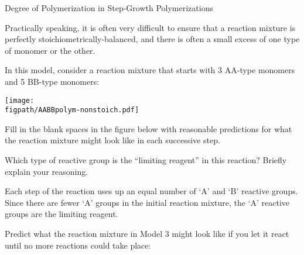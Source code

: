 \begin{activity}{Degree of Polymerization in Step-Growth Polymerizations}
\begin{model}

Practically speaking, it is often very difficult to ensure that a reaction mixture is perfectly stoichiometrically-balanced, and there is often a small excess of one type of monomer or the other.

In this model, consider a reaction mixture that starts with 3 AA-type monomers and 5 BB-type monomers:

\vspace{0.1in}
\centerline{\texttt{[image: \\figpath/AABBpolym-nonstoich.pdf]}}

\end{model}

\begin{ctqs}

		\question Fill in the blank spaces in the figure below with reasonable predictions for what the reaction mixture might look like in each successive step.
		
			\begin{solution}[1in]
			\end{solution}
		
		\clearpage
		\question Which type of reactive group is the ``limiting reagent'' in this reaction?  Briefly explain your reasoning.
		
			\begin{solution}[1in]
				Each step of the reaction uses up an equal number of `A' and `B' reactive groups. Since there are fewer `A' groups in the initial reaction mixture, the `A' reactive groups are the limiting reagent.
			\end{solution}
		
		\question \label{ctq:nonstoichpredict} Predict what the reaction mixture in Model 3 might look like if you let it react until no more reactions could take place:
		
\begin{solution}
\end{solution}
		

\end{ctqs}
\end{activity}
